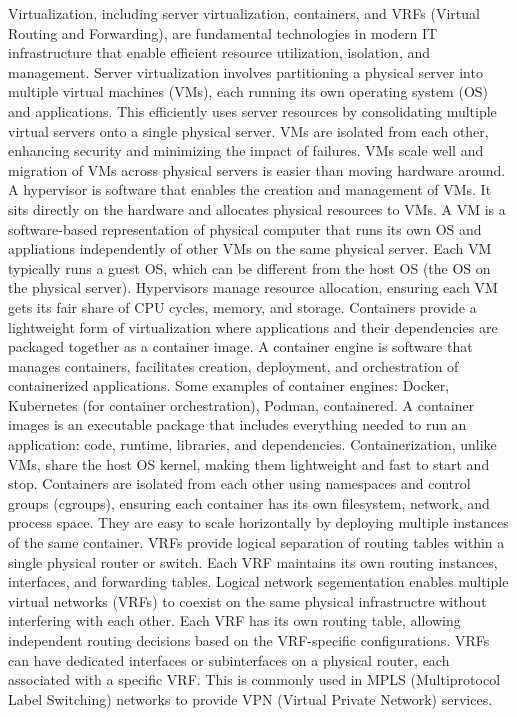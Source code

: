 \documentclass{article}
\begin{document}
 	Virtualization, including server virtualization, containers, and VRFs (Virtual Routing and Forwarding), are fundamental technologies in modern IT infrastructure that enable efficient resource utilization, isolation, and management. Server virtualization involves partitioning a physical server into multiple virtual machines (VMs), each running its own operating system (OS) and applications. This efficiently uses server resources by consolidating multiple virtual servers onto a single physical server. VMs are isolated from each other, enhancing security and minimizing the impact of failures. VMs scale well and migration of VMs across physical servers is easier than moving hardware around. A hypervisor is software that enables the creation and management of VMs. It sits directly on the hardware and allocates physical resources to VMs. A VM is a software-based representation of physical computer that runs its own OS and appliations independently of other VMs on the same physical server. Each VM typically runs a guest OS, which can be different from the host OS (the OS on the physical server). Hypervisors manage resource allocation, ensuring each VM gets its fair share of CPU cycles, memory, and storage. Containers provide a lightweight form of virtualization where applications and their dependencies are packaged together as a container image. A container engine is software that manages containers, facilitates creation, deployment, and orchestration of containerized applications. Some examples of container engines: Docker, Kubernetes (for container orchestration), Podman, containered. A container images is an executable package that includes everything needed to run an application: code, runtime, libraries, and dependencies. Containerization, unlike VMs, share the host OS kernel, making them lightweight and fast to start and stop. Containers are isolated from each other using namespaces and control groups (cgroups), ensuring each container has its own filesystem, network, and process space. They are easy to scale horizontally by deploying multiple instances of the same container. VRFs provide logical separation of routing tables within a single physical router or switch. Each VRF maintains its own routing instances, interfaces, and forwarding tables. Logical network segementation enables multiple virtual networks (VRFs) to coexist on the same physical infrastructre without interfering with each other. Each VRF has its own routing table, allowing independent routing decisions based on the VRF-specific configurations. VRFs can have dedicated interfaces or subinterfaces on a physical router, each associated with a specific VRF. This is commonly used in MPLS (Multiprotocol Label Switching) networks to provide VPN (Virtual Private Network) services.\\
\end{document}
